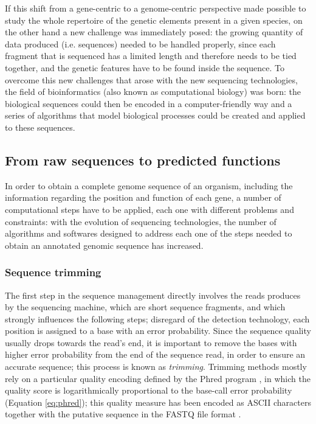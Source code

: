If this shift from a gene-centric to a genome-centric perspective made possible to study the whole repertoire of the genetic elements present in a given species, on the other hand a new challenge was immediately posed: the growing quantity of data produced (i.e. sequences) needed to be handled properly, since each fragment that is sequenced has a limited length and therefore needs to be tied together, and the genetic features have to be found inside the sequence. To overcome this new challenges that arose with the new sequencing technologies, the field of bioinformatics (also known as computational biology) was born: the biological sequences could then be encoded in a computer-friendly way and a series of algorithms that model biological processes could be created and applied to these sequences.

\subsection{From raw sequences to predicted functions}
In order to obtain a complete genome sequence of an organism, including the information regarding the position and function of each gene, a number of computational steps have to be applied, each one with different problems and constraints: with the evolution of sequencing technologies, the number of algorithms and softwares designed to address each one of the steps needed to obtain an annotated genomic sequence has increased.

\subsubsection*{Sequence trimming}
The first step in the sequence management directly involves the reads produces by the sequencing machine, which are short sequence fragments, and which strongly influences the following steps; disregard of the detection technology, each position is assigned to a base with an error probability. Since the sequence quality usually drops towards the read's end, it is important to remove the bases with higher error probability from the end of the sequence read, in order to ensure an accurate sequence; this process is known as \textit{trimming}. Trimming methods mostly rely on a particular quality encoding defined by the Phred program \cite{ewing1998base}\cite{ewing1998base2}, in which the quality score is logarithmically proportional to the base-call error probability (Equation \ref{eq:phred}); this quality measure has been encoded as ASCII characters together with the putative sequence in the FASTQ file format \cite{cock2010sanger}. 

